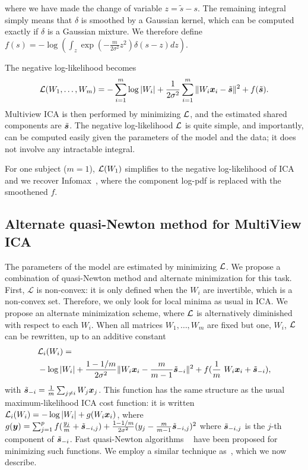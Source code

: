 where we have made the change of variable $z=\tilde{s}-s$. The remaining integral simply means that $\delta$ is smoothed by a Gaussian kernel, which can be computed exactly if $\delta$ is a Gaussian mixture. We therefore define $f(s) = -\log \left(\int_z \exp \left(-\frac{m}{2\sigma^2} z^2 \right) \delta(s-z) dz\right)$.

The negative log-likelihood becomes
\begin{equation}
    \label{eq:cost_function}
    \mathcal{L}(W_1, \dots, W_m) = -\sum_{i=1}^m \log|W_i| + \frac1{2\sigma^2}\sum_{i=1}^m\|W_i\boldsymbol{x}_i - \tilde{\boldsymbol{s}}\|^2 + f(\tilde{\boldsymbol{s}}).
\end{equation}
Multiview ICA is then performed by minimizing $\mathcal{L}$, and the estimated shared components are $\tilde{\boldsymbol{s}}$.
The negative log-likelihood $\mathcal{L}$ is quite simple, and importantly, can be computed easily given the parameters of the model and the data; it does not involve any intractable integral.
%

For one subject ($m=1$), $\mathcal{L}(W_1)$ simplifies to the negative log-likelihood of ICA and we recover Infomax~\cite{bell1995information,cardoso1997infomax}, where the component log-pdf is replaced with the smoothened $f$.
%

\subsection{Alternate quasi-Newton method for MultiView ICA}
%
The parameters of the model are estimated by minimizing $\mathcal{L}$.
%
We propose a combination of quasi-Newton method and alternate minimization for this task.
%
First, $\mathcal{L}$ is non-convex: it is only defined when the $W_i$ are invertible, which is a non-convex set.
%
Therefore, we only look for local minima as usual in ICA.
%
We propose an alternate minimization scheme, where $\mathcal{L}$ is alternatively diminished with respect to each $W_i$. 
%
When all matrices $W_1, \dots, W_m$ are fixed but one, $W_i$, $\mathcal{L}$ can be rewritten, up to an additive constant 
\begin{align}
    \label{eq:indiv_loss}
    &\loss_i(W_i) = \nonumber  \\&-\log|W_i| + \frac{1 - 1/m}{2\sigma^2}\|W_i\xb_i - \frac{m}{m-1}\tilde{\sbb}_{-i}\|^2 + f(\frac1m W_i \xb_i +\tilde{\sbb}_{-i}), 
\end{align}
with $\tilde{\boldsymbol{s}}_{-i} = \frac1m \sum_{j \neq i}W_j \boldsymbol{x}_j$.
%
This function has the same structure as the usual maximum-likelihood ICA cost
function: it is written $\mathcal{L}_i(W_i) = -\log|W_i| + g(W_i\boldsymbol{x}_i)$, where $g(\boldsymbol{y})
= \sum_{j=1}^pf(\frac{y_j}{m} + \tilde{\boldsymbol{s}}_{-i, j}) + \frac{1 -
  1/m}{2\sigma^2}(y_j - \frac{m}{m-1}\tilde{\boldsymbol{s}}_{-i, j})^2$ where
$\tilde{\boldsymbol{s}}_{-i, j}$ is the $j$-th component of $\tilde{\boldsymbol{s}}_{-i}$.
%
Fast quasi-Newton algorithms ~\cite{zibulevsky2003blind, ablin2018faster} have been proposed for minimizing such functions.
%
We employ a similar technique as~\cite{zibulevsky2003blind}, which we now describe.

